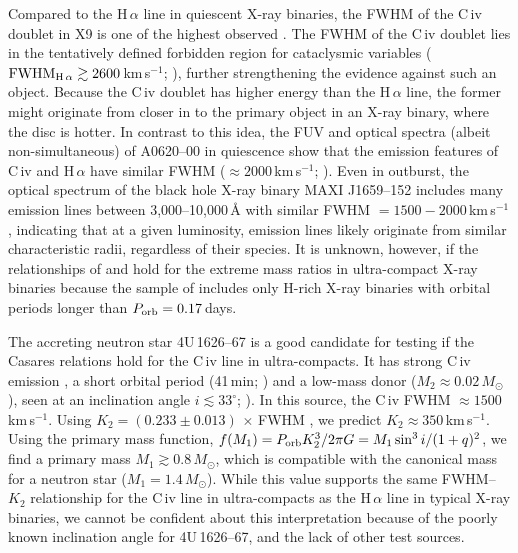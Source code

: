 \documentclass[a4paper,fleqn,usenatbib]{mnras}
\begin{document}
Compared to the H\,$\alpha$ line in quiescent X-ray binaries, the FWHM of the C\,{\sc iv} doublet in X9 is one of the highest observed \citep{2015ApJ...808...80C}. The FWHM of the C\,{\sc iv} doublet lies in the tentatively defined forbidden region for cataclysmic variables ($\rm FWHM_{H\,\alpha} \gtrsim 2600$\,km\,s$^{-1}$; \citealp{2015ApJ...808...80C}), further strengthening the evidence against such an object. Because the C\,{\sc iv} doublet has higher energy than the H\,$\alpha$ line, the former might originate from closer in to the primary object in an X-ray binary, where the disc is hotter. In contrast to this idea, the FUV and optical spectra (albeit non-simultaneous) of A0620--00 in quiescence show that the emission features of C\,{\sc iv} and H\,$\alpha$ have similar FWHM ($\approx 2000$\,km\,s$^{-1}$; \citealp{1994MNRAS.266..137M, 2011ApJ...743...26F}). Even in outburst, the optical spectrum of the black hole X-ray binary MAXI J1659--152 includes many emission lines between 3,000--10,000\,{\AA} with similar FWHM $= 1500-2000$\,km\,s$^{-1}$ \citep{2012ApJ...746L..23K}, indicating that at a given luminosity, emission lines likely originate from similar characteristic radii, regardless of their species. It is unknown, however, if the relationships of \citet{2015ApJ...808...80C} and \citet{2016ApJ...822...99C} hold for the extreme mass ratios in ultra-compact X-ray binaries because the sample of \citet{2015ApJ...808...80C} includes only H-rich X-ray binaries with orbital periods longer than $P_{\rm orb} = 0.17$\,days.

The accreting neutron star 4U\,1626--67 is a good candidate for testing if the Casares relations hold for the C\,{\sc iv} line in ultra-compacts. It has strong C\,{\sc iv} emission \citep{2002AJ....124.3348H}, a short orbital period (41\,min; \citealp{1981ApJ...244.1001M}) and a low-mass donor ($M_2 \approx 0.02\,M_\odot$), seen at an inclination angle $i \lesssim 33^{\circ}$; \citealp{1990A&A...234..195V, 1998ApJ...492..342C}). In this source, the C\,{\sc iv} FWHM $\approx 1500$\,km\,s$^{-1}$. Using $K_2 = (0.233 \pm 0.013) \, \times$\,FWHM \citep{2015ApJ...808...80C}, we predict $K_2 \approx 350$\,km\,s$^{-1}$. Using the primary mass function, $f(M_1) = P_{\rm orb} K_2^3 / 2 \pi G = M_1 \sin^3 i / (1+q)^2$, we find a primary mass $M_1 \gtrsim 0.8\,M_\odot$, which is compatible with the canonical mass for a neutron star ($M_1 = 1.4\,M_\odot$). While this value supports the same FWHM--$K_2$ relationship for the C\,{\sc iv} line in ultra-compacts as the H\,$\alpha$ line in typical X-ray binaries, we cannot be confident about this interpretation because of the poorly known inclination angle for 4U\,1626--67, and the lack of other test sources.
\end{document}
